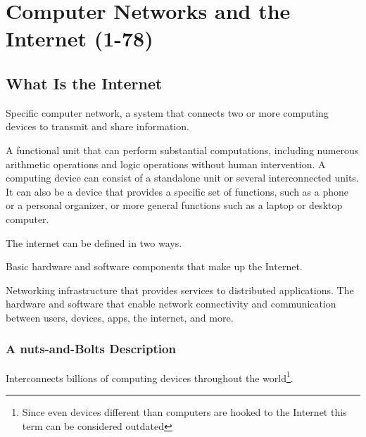 \chapter{Computer Networks and the Internet (1-78)}



\section{What Is the Internet}

\begin{definition}\label{def:public_internet}
    Specific computer network, a system that connects two or more computing devices to transmit and share information.
\end{definition}

\begin{definition}\label{def:computing_device}
    A functional unit that can perform substantial computations, including numerous arithmetic operations and logic operations without human intervention. A computing device can consist of a standalone unit or several interconnected units. It can also be a device that provides a specific set of functions, such as a phone or a personal organizer, or more general functions such as a laptop or desktop computer. 
\end{definition}

\begin{definition*}
    The internet can be defined in two ways.
\begin{definition}\label{def:internet1}
    Basic hardware and software components that make up the Internet.
  \end{definition}
  \begin{definition}\label{def:internet2}
     Networking infrastructure that provides services to distributed applications. 
     The hardware and software that enable network connectivity and communication between users, devices, apps, the internet, and more.
  \end{definition}
\end{definition*}
\newpage

    \subsection{A nuts-and-Bolts Description}
        \begin{definition}\label{def:computer_network}
            Interconnects billions of computing devices throughout the world\footnote{Since even devices different than computers are hooked to the Internet this term can be considered outdated}.    
        \end{definition}

